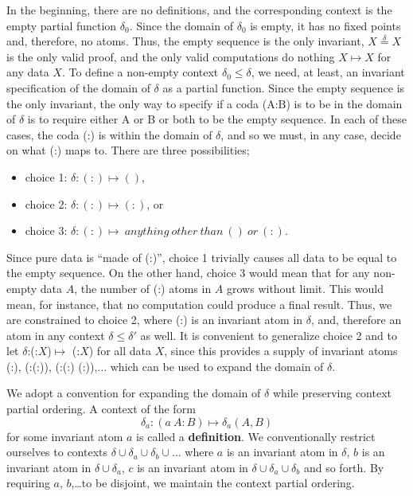 \documentclass[11pt]{article}
\begin{document}
     In the beginning, there are no definitions, and the corresponding context is the empty partial function $\delta_0$.  
Since the domain of $\delta_0$ is empty, it has no fixed points and, therefore, no atoms.  Thus, the empty sequence is the only invariant, 
$X{\overset \delta =}X$ is the only valid proof, and the only valid 
 computations do nothing $X\mapsto X$ for any data $X$.
To define a non-empty context $\delta_0\le\delta$, we need, at least, an invariant specification of the domain of $\delta$ as a partial function.    
Since the empty sequence is the only invariant, the only way to specify if a coda (A:B) is to be in the domain of $\delta$ is 
to require either A or B or both to be the empty sequence. In each of these cases, the coda (:) is within the domain of $\delta$, and so we must, in any case, 
decide on what (:) maps to.  There are three possibilities; 
\begin{itemize}
\item[] choice 1: {$\delta: (:) \mapsto ()$},
\item[] choice 2: {$\delta: (:) \mapsto (:)$}, or 
\item[] choice 3: {$\delta: (:) \mapsto \ anything\ other\ than\ ()\ or\ (:)$}. 
\end{itemize}
Since pure data is ``made of (:)'', choice 1 trivially causes all data to be equal to the empty sequence. 
On the other hand, choice 3 would mean that for any non-empty data $A$, the number of (:) atoms in $A$ grows without limit.  This would mean, for instance, 
that no computation could produce a final result.  Thus, we are constrained to choice 2, where (:) is an invariant atom in $\delta$, and, therefore an atom in 
any context $\delta\leq\delta'$ as well.  It is convenient to generalize choice 2 and to let $\delta$:(:$X$)$\mapsto$ (:$X$) for all data $X$, since this provides a 
supply of invariant atoms (:), (:(:)), (:(:) (:)),$\dots$ which can be used to expand the domain of $\delta$.  

We adopt a convention for expanding the domain of $\delta$ while preserving context partial ordering. 
A context of the form 
\begin{equation}
	\delta_a: (a\ A:B) \mapsto \delta_a(A,B)
\end{equation}
for some invariant atom $a$ is called a {\bf definition}.  We conventionally restrict ourselves to 
contexts $\delta\cup\delta_a\cup\delta_b\cup\dots$ where $a$ is an invariant atom in $\delta$, $b$ is an invariant atom in $\delta\cup\delta_a$, $c$ is an invariant atom in $\delta\cup\delta_a\cup\delta_b$ and so forth.  By requiring $a$, $b$,\dots to be disjoint, we maintain the context partial ordering.  
\end{document}
